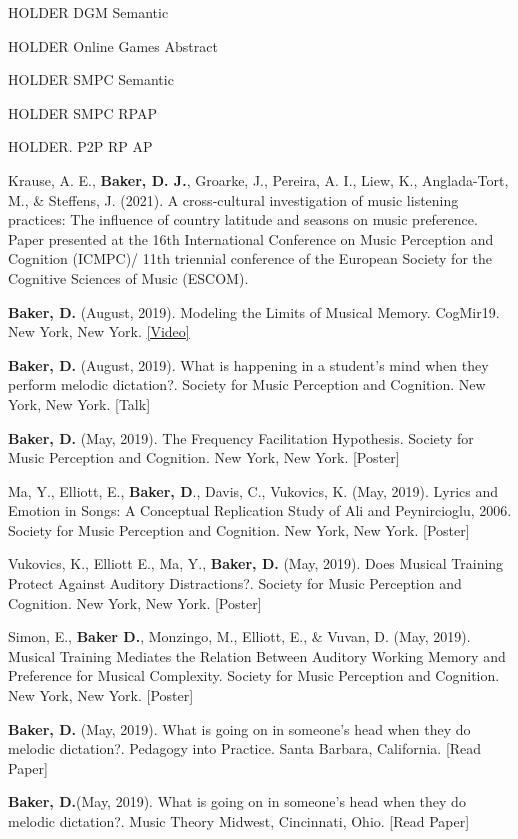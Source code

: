 \begin{hangparas}{.25in}{1}


HOLDER DGM Semantic 

HOLDER Online Games Abstract 

HOLDER SMPC Semantic 

HOLDER SMPC RPAP 

HOLDER. P2P RP AP 


Krause, A. E., \textbf{ Baker, D. J.}, Groarke, J., Pereira, A. I., Liew, K., Anglada-Tort, M., & Steffens, J. (2021). A cross‐cultural investigation of music listening practices: The influence of country latitude and seasons on music preference. Paper presented at the 16th International Conference on Music Perception and Cognition (ICMPC)/ 11th triennial conference of the European Society for the Cognitive Sciences of Music (ESCOM).

\textbf{Baker, D.} (August, 2019). Modeling the Limits of Musical Memory. CogMir19. New York, New York. \href{https://www.youtube.com/watch?v=T6G4m6_xFrc}{[Video]} 

\textbf{Baker, D.} (August, 2019). What is happening in a student’s mind when they perform melodic dictation?. Society for Music Perception and Cognition. New York, New York.  [Talk] 

\textbf{Baker, D.} (May, 2019). The Frequency Facilitation Hypothesis. Society for Music Perception and Cognition. New York, New York. [Poster] 

Ma, Y., Elliott, E., \textbf{Baker, D}., Davis, C., Vukovics, K. (May, 2019). Lyrics and Emotion in Songs: A Conceptual Replication Study of Ali and Peynircioglu, 2006. Society for Music Perception and Cognition. New York, New York. [Poster] 

Vukovics, K., Elliott E., Ma, Y., \textbf{ Baker, D.} (May, 2019). Does Musical Training Protect Against Auditory Distractions?. Society for Music Perception and Cognition. New York, New York. [Poster] 

Simon, E., \textbf{Baker D.}, Monzingo, M., Elliott, E., & Vuvan, D. (May, 2019). Musical Training Mediates the Relation Between Auditory Working Memory and Preference for Musical Complexity. Society for Music Perception and Cognition. New York, New York. [Poster]

\textbf{Baker, D.} (May, 2019). What is going on in someone’s head when they do melodic dictation?. Pedagogy into Practice. Santa Barbara, California.  [Read Paper] 

\textbf{Baker, D.}(May, 2019). What is going on in someone’s head when they do melodic dictation?. Music Theory Midwest, Cincinnati, Ohio. [Read Paper] 


\end{hangparas}

